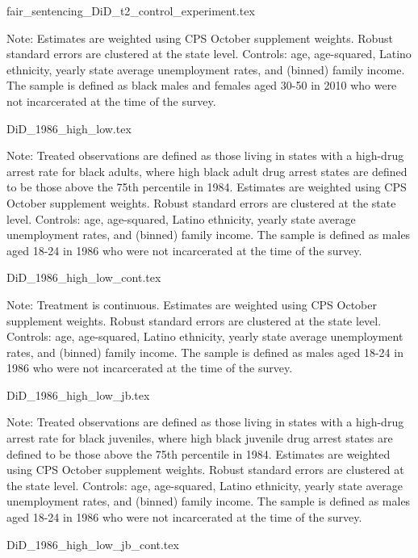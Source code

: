 {fair_sentencing_DiD_t2_control_experiment.tex}
\begin{footnotesize}
  \noindent Note: Estimates are weighted using CPS October supplement weights. Robust standard errors are clustered at the state level. Controls: age, age-squared, Latino ethnicity, yearly state average unemployment rates, and (binned) family income. The sample is defined as black males and females aged 30-50 in 2010 who were not incarcerated at the time of the survey.
\end{footnotesize}
\clearpage

{DiD_1986_high_low.tex}
\begin{footnotesize}
  \noindent Note: Treated observations are defined as those living in states with a high-drug arrest rate for black adults, where high black adult drug arrest states are defined to be those above the 75th percentile in 1984. Estimates are weighted using CPS October supplement weights. Robust standard errors are clustered at the state level. Controls: age, age-squared, Latino ethnicity, yearly state average unemployment rates, and (binned) family income. The sample is defined as males aged 18-24 in 1986 who were not incarcerated at the time of the survey.
\end{footnotesize}

{DiD_1986_high_low_cont.tex}
\begin{footnotesize}
  \noindent Note: Treatment is continuous. Estimates are weighted using CPS October supplement weights. Robust standard errors are clustered at the state level. Controls: age, age-squared, Latino ethnicity, yearly state average unemployment rates, and (binned) family income. The sample is defined as males aged 18-24 in 1986 who were not incarcerated at the time of the survey.
\end{footnotesize}
\clearpage

{DiD_1986_high_low_jb.tex}
\begin{footnotesize}
  \noindent Note: Treated observations are defined as those living in states with a high-drug arrest rate for black juveniles, where high black juvenile drug arrest states are defined to be those above the 75th percentile in 1984. Estimates are weighted using CPS October supplement weights. Robust standard errors are clustered at the state level. Controls: age, age-squared, Latino ethnicity, yearly state average unemployment rates, and (binned) family income. The sample is defined as males aged 18-24 in 1986 who were not incarcerated at the time of the survey.
\end{footnotesize}
{DiD_1986_high_low_jb_cont.tex}
\clearpage

